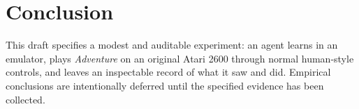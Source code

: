 \documentclass[11pt]{article}
\begin{document}
\section{Conclusion}

This draft specifies a modest and auditable experiment: an agent learns in an
emulator, plays \emph{Adventure} on an original Atari 2600 through normal
human-style controls, and leaves an inspectable record of what it saw and did.
Empirical conclusions are intentionally deferred until the specified evidence
has been collected.



\end{document}
